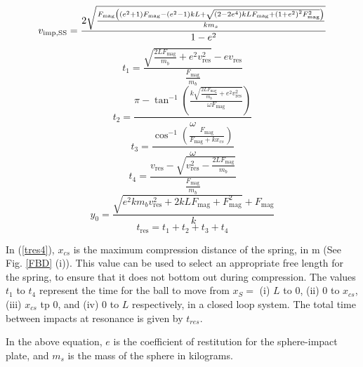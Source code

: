 \documentclass[letterpaper, 10 pt, conference]{ieeeconf}  %
\begin{document}
\begin{equation}
\label{Resonant_CLvelocity}
\scriptsize
v_{\text{imp},\text{SS}}=\frac{2 \sqrt{\frac{F_{\text{mag}} \left(\left(e^2+1\right) F_{\text{mag}}-\left(e^2-1\right) k L+\sqrt{\left(2-2 e^4\right) k L F_{\text{mag}}+\left(1+e^2\right)^2 F_{\text{mag}}^2}\right)}{k m_s}}}{1-e^2}
\end{equation}
\begin{equation}
t_1=\frac{\sqrt{\frac{2 L F_{\text{mag}}}{m_b}+e^2 v_{\text{res}}^2}-e v_{\text{res}}}{\frac{F_{\text{mag}}}{m_b}}
\end{equation}
\begin{equation}
t_2=\frac{\pi -\tan ^{-1}\left(\frac{k \sqrt{\frac{2 L F_{\text{mag}}}{m_b}+e^2 v_{\text{res}}^2}}{\omega  F_{\text{mag}}}\right)}{\omega }
\label{tres2}
\end{equation}
\begin{equation}
t_3=\frac{\cos ^{-1}\left(\frac{F_{\text{mag}}}{F_{\text{mag}}+k x_{cs}}\right)}{\omega }
\label{tres3}
\end{equation}
\begin{equation}
t_4=\frac{v_{\text{res}}-\sqrt{v_{\text{res}}^2-\frac{2 L F_{\text{mag}}}{m_b}}}{\frac{F_{\text{mag}}}{m_b}}
\label{tres4}
\end{equation}
\begin{equation}
y_0=\frac{\sqrt{e^2 k m_b v_{\text{res}}^2+2 k L F_{\text{mag}}+F_{\text{mag}}^2}+F_{\text{mag}}}{k}
\label{tres5}
\end{equation}
\begin{equation}
t_{\text{res}}=t_1+t_2+t_3+t_4
\label{tres6}
\end{equation}

In (\ref{tres4}), $x_{cs}$ is the maximum compression distance of the spring, in m (See Fig. \ref{FBD} (i)). This value can be used to select an appropriate free length for the spring, to ensure that it does not bottom out during compression. The values $t_1$ to $t_4$ represent the time for the ball to move from $x_S =$ (i) $L$ to 0, (ii) 0 to $x_{cs}$, (iii) $x_{cs}$ tp 0, and (iv) 0 to $L$ respectively, in a closed loop system. The total time between impacts at resonance is given by $t_{res}$. 






In the above equation, $e$ is the coefficient of restitution for the sphere-impact plate, and $m_s$ is the mass of the sphere in kilograms.
\end{document}
